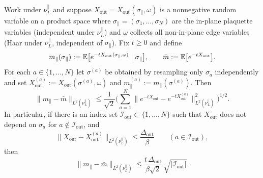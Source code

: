 \begin{lemma}
\label{lem:routeC_mparallel_from_influences}
Work under $\nu_L^{\parallel}$ and suppose $X_{\mathrm{out}}=X_{\mathrm{out}}(\sigma_{\parallel},\omega)$ is a nonnegative random variable on a product space where
$\sigma_{\parallel}=(\sigma_1,\dots,\sigma_N)$ are the in-plane plaquette variables (independent under $\nu_L^{\parallel}$)
and $\omega$ collects all non-in-plane edge variables (Haar under $\nu_L^{\parallel}$, independent of $\sigma_{\parallel}$).
Fix $t\ge 0$ and define
\[
m_\parallel(\sigma_{\parallel}) := \mathbb E\bigl[e^{-t X_{\mathrm{out}}(\sigma_{\parallel},\omega)}\bigm| \sigma_{\parallel}\bigr],
\qquad
\bar m := \mathbb E\bigl[e^{-tX_{\mathrm{out}}}\bigr].
\]
For each $a\in\{1,\dots,N\}$ let $\sigma^{(a)}$ be obtained by resampling only $\sigma_a$ independently and set
$X_{\mathrm{out}}^{(a)} := X_{\mathrm{out}}(\sigma^{(a)},\omega)$ and $m_\parallel^{(a)} := m_\parallel(\sigma^{(a)})$.
Then
\begin{equation}\label{eq:routeC_mparallel_efronstein}
\|m_\parallel-\bar m\|_{L^2(\nu_L^{\parallel})}
\le \frac{1}{\sqrt2}\Big(\sum_{a=1}^N \|e^{-tX_{\mathrm{out}}}-e^{-tX_{\mathrm{out}}^{(a)}}\|_{L^2(\nu_L^{\parallel})}^2\Big)^{1/2}.
\end{equation}
In particular, if there is an index set $\mathcal I_{\mathrm{out}}\subset\{1,\dots,N\}$ such that
$X_{\mathrm{out}}$ does not depend on $\sigma_a$ for $a\notin\mathcal I_{\mathrm{out}}$, and
\begin{equation}\label{eq:routeC_Xout_influence}
\|X_{\mathrm{out}}-X_{\mathrm{out}}^{(a)}\|_{L^2(\nu_L^{\parallel})}\le \frac{\Delta_{\mathrm{out}}}{\beta}\qquad(a\in\mathcal I_{\mathrm{out}}),
\end{equation}
then
\begin{equation}\label{eq:routeC_mparallel_influence_bound}
\|m_\parallel-\bar m\|_{L^2(\nu_L^{\parallel})}
\le \frac{t\,\Delta_{\mathrm{out}}}{\beta\sqrt2}\,\sqrt{|\mathcal I_{\mathrm{out}}|}.
\end{equation}
\end{lemma}

